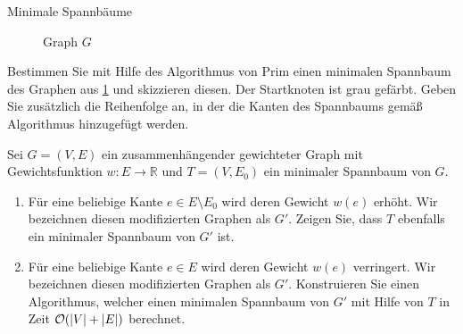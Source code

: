 \documentclass{exercisesheet}
\begin{document}
\begin{eexercises}{Minimale Spannbäume}
{\begin{figure}[ht]
      \caption{Graph $G$}\label{fig:mstgraph}
    \end{figure}
  }
  \item Bestimmen Sie mit Hilfe des Algorithmus von Prim einen minimalen Spannbaum des Graphen aus \ref{fig:mstgraph} und skizzieren diesen. Der Startknoten ist grau gefärbt. Geben Sie zusätzlich die Reihenfolge an, in der die Kanten des Spannbaums gemäß Algorithmus hinzugefügt werden.
  \item Sei $G = (V, E)$ ein zusammenhängender gewichteter Graph mit Gewichtsfunktion $w : E \rightarrow \mathbb{R}$ und $T = (V, E_0)$ ein minimaler Spannbaum von $G$.
  \begin{enumerate}
    \item Für eine beliebige Kante $e \in E \setminus E_0$ wird deren Gewicht $w(e)$ erhöht. Wir bezeichnen diesen modifizierten Graphen als $G'$. Zeigen Sie, dass $T$ ebenfalls ein minimaler Spannbaum von $G'$ ist.
    \item Für eine beliebige Kante $e \in E$ wird deren Gewicht $w(e)$ verringert. Wir bezeichnen diesen modifizierten Graphen als $G'$. Konstruieren Sie einen Algorithmus, welcher einen minimalen Spannbaum von $G'$ mit Hilfe von $T$ in Zeit $\mathcal{O}(|V| + |E|)$ berechnet.
  \end{enumerate}
\end{eexercises}
\end{document}

